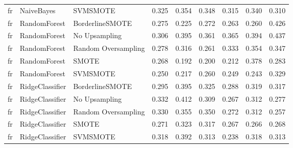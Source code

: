 \begin{tabular}{lllllllll}
      fr &                   NaiveBayes &            SVMSMOTE & 0.325 &                     0.354 &                 0.348 &                  0.315 &                                   0.340 &     0.310 \\
      fr &                 RandomForest &     BorderlineSMOTE & 0.275 &                     0.225 &                 0.272 &                  0.263 &                                   0.260 &     0.426 \\
      fr &                 RandomForest &       No Upsampling & 0.306 &                     0.395 &                 0.361 &                  0.365 &                                   0.394 &     0.437 \\
      fr &                 RandomForest & Random Oversampling & 0.278 &                     0.316 &                 0.261 &                  0.333 &                                   0.354 &     0.347 \\
      fr &                 RandomForest &               SMOTE & 0.268 &                     0.192 &                 0.200 &                  0.212 &                                   0.378 &     0.283 \\
      fr &                 RandomForest &            SVMSMOTE & 0.250 &                     0.217 &                 0.260 &                  0.249 &                                   0.243 &     0.329 \\
      fr &              RidgeClassifier &     BorderlineSMOTE & 0.295 &                     0.395 &                 0.325 &                  0.288 &                                   0.319 &     0.317 \\
      fr &              RidgeClassifier &       No Upsampling & 0.332 &                     0.412 &                 0.309 &                  0.267 &                                   0.312 &     0.277 \\
      fr &              RidgeClassifier & Random Oversampling & 0.330 &                     0.355 &                 0.350 &                  0.272 &                                   0.312 &     0.257 \\
      fr &              RidgeClassifier &               SMOTE & 0.271 &                     0.323 &                 0.317 &                  0.267 &                                   0.266 &     0.268 \\
      fr &              RidgeClassifier &            SVMSMOTE & 0.318 &                     0.392 &                 0.313 &                  0.238 &                                   0.318 &     0.313 \\

\end{tabular}
